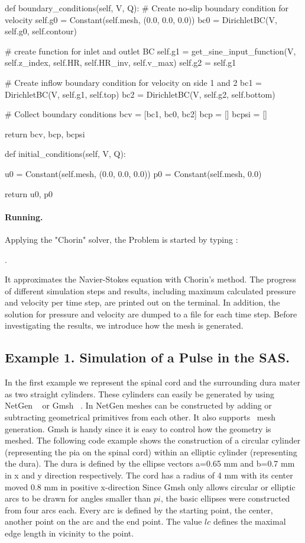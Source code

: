 \begin{python}
def boundary_conditions(self, V, Q):
	# Create no-slip boundary condition for velocity
	self.g0 = Constant(self.mesh, (0.0, 0.0, 0.0))
	bc0 = DirichletBC(V, self.g0, self.contour)

	# create function for inlet and outlet BC
	self.g1 = get_sine_input_function(V, self.z_index, self.HR, self.HR_inv, self.v_max)
	self.g2 = self.g1

	# Create inflow boundary condition for velocity on side 1 and 2
	bc1 = DirichletBC(V, self.g1, self.top)
	bc2 = DirichletBC(V, self.g2, self.bottom)

	# Collect boundary conditions
	bcv = [bc1, bc0, bc2]
	bcp = []
	bcpsi = []

	return bcv, bcp, bcpsi

def initial_conditions(self, V, Q):

	u0 = Constant(self.mesh, (0.0, 0.0, 0.0))
	p0 = Constant(self.mesh, 0.0)

	return u0, p0
\end{python}


\paragraph{Running.}
Applying the "Chorin" solver, the Problem is started by typing :

.

It approximates the Navier-Stokes equation with Chorin's method. The progress of different simulation steps and results, including maximum calculated pressure and velocity per time step, are printed out on the terminal. In addition, the solution for pressure and velocity are dumped to a file for each  time step. Before investigating the results, we introduce how the mesh is generated.


\subsection{Example 1. Simulation of a Pulse in the SAS.}
In the first example we represent the spinal cord and the surrounding dura mater as two straight cylinders.  These cylinders can easily be generated by using NetGen ~\cite{SchoberlGerstmayrGaisbauer} or Gmsh ~\cite{GeuzaineRemacle}.  In NetGen meshes can be constructed by adding or subtracting geometrical primitives from each other. It also supports \dolfin\ mesh generation. Gmsh is handy since it is easy to control how the geometry is meshed. The following code example shows the construction of a circular cylinder (representing the pia on the spinal cord) within an elliptic cylinder (representing the dura). The dura is defined by the ellipse vectors a=0.65 mm and b=0.7 mm in x and y direction respectively. The cord has a radius of 4 mm with its center moved 0.8 mm in positive x-direction  Since Gmsh only allows circular or elliptic arcs to be drawn for angles smaller than $pi$, the basic ellipses were constructed from four arcs each. Every arc is defined by the starting point, the center, another point on the arc and the end point. The value $lc$  defines the maximal edge length in vicinity to the point.

